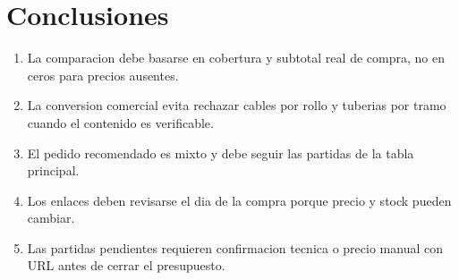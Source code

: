 \documentclass[11pt,a4paper]{article}
\begin{document}
\section{Conclusiones}
\begin{enumerate}
\item La comparacion debe basarse en cobertura y subtotal real de compra, no en ceros para precios ausentes.
\item La conversion comercial evita rechazar cables por rollo y tuberias por tramo cuando el contenido es verificable.
\item El pedido recomendado es mixto y debe seguir las partidas de la tabla principal.
\item Los enlaces deben revisarse el dia de la compra porque precio y stock pueden cambiar.
\item Las partidas pendientes requieren confirmacion tecnica o precio manual con URL antes de cerrar el presupuesto.
\end{enumerate}
\end{document}
